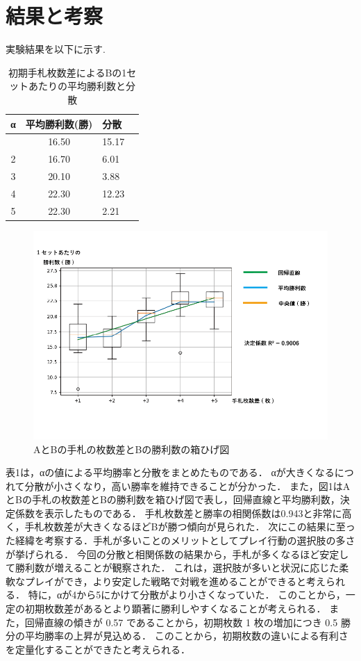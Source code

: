 \documentclass[twocolumn]{ltjsarticle}
\begin{document}
\section{結果と考察}
\small{
  実験結果を以下に示す.
}
\begin{table}[h]
  \centering
  \caption{初期手札枚数差によるBの1セットあたりの平均勝利数と分散}
  \begin{tabular}{clll}
    α &平均勝利数(勝)& 分散\\
    \hline \hline
    \centering
    1&\multicolumn{1}{c}{16.50}&\multicolumn{1}{l}{15.17}\\
    2&\multicolumn{1}{c}{16.70}&\multicolumn{1}{l}{6.01}\\
    3&\multicolumn{1}{c}{20.10}&\multicolumn{1}{l}{3.88}\\
    4&\multicolumn{1}{c}{22.30}&\multicolumn{1}{l}{12.23}\\
    5&\multicolumn{1}{c}{22.30}&\multicolumn{1}{l}{2.21}\\
    \hline%
  \end{tabular}
\end{table}
\begin{figure}[h]
  \centering
  \includegraphics[scale = 0.3]{graph1.png}
  \caption{AとBの手札の枚数差とBの勝利数の箱ひげ図}
  \label{piyo}
\end{figure}

\small{
表1は，αの値による平均勝率と分散をまとめたものである．
αが大きくなるにつれて分散が小さくなり，高い勝率を維持できることが分かった．
また，図1はAとBの手札の枚数差とBの勝利数を箱ひげ図で表し，回帰直線と平均勝利数，決定係数を表示したものである．
手札枚数差と勝率の相関係数は0.943と非常に高く，手札枚数差が大きくなるほどBが勝つ傾向が見られた．
次にこの結果に至った経緯を考察する．手札が多いことのメリットとしてプレイ行動の選択肢の多さが挙げられる．
今回の分散と相関係数の結果から，手札が多くなるほど安定して勝利数が増えることが観察された．
これは，選択肢が多いと状況に応じた柔軟なプレイができ，より安定した戦略で対戦を進めることができると考えられる．
特に，αが4から5にかけて分散がより小さくなっていた．
このことから，一定の初期枚数差があるとより顕著に勝利しやすくなることが考えられる．
また，回帰直線の傾きが 0.57 であることから，初期枚数 1 枚の増加につき 0.5 勝分の平均勝率の上昇が見込める．
このことから，初期枚数の違いによる有利さを定量化することができたと考えられる．
}
\end{document}
